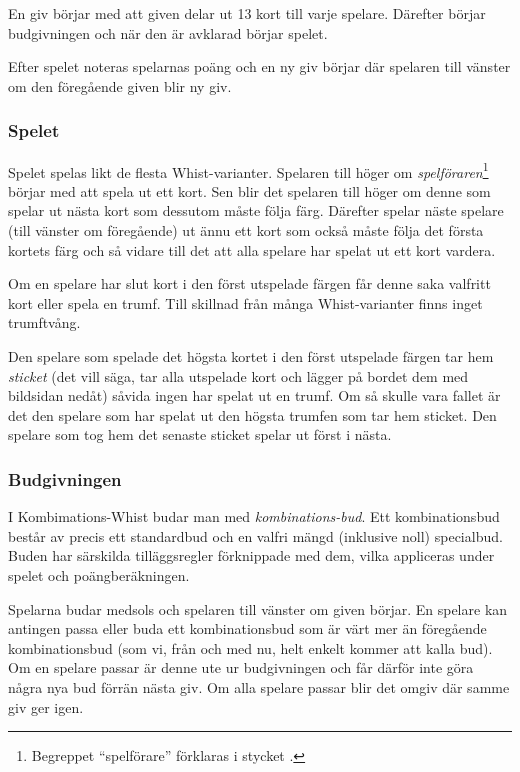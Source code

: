 \documentclass[a4paper]{article}
\begin{document}
			En giv börjar med att given delar ut 13 kort till varje spelare. Därefter börjar budgivningen och när den är avklarad börjar spelet.

			Efter spelet noteras spelarnas poäng och en ny giv börjar där spelaren till vänster om den föregående given blir ny giv.

			\subsubsection{Spelet}
				Spelet spelas likt de flesta Whist-varianter. Spelaren till höger om \emph{spelföraren}\footnote{Begreppet ``spelförare'' förklaras i stycket \textit{}.} börjar med att spela ut ett kort. Sen blir det spelaren till höger om denne som spelar ut nästa kort som dessutom måste följa färg. Därefter spelar näste spelare (till vänster om föregående) ut ännu ett kort som också måste följa det första kortets färg och så vidare till det att alla spelare har spelat ut ett kort vardera.

				Om en spelare har slut kort i den först utspelade färgen får denne saka valfritt kort eller spela en trumf. Till skillnad från många Whist-varianter finns inget trumftvång.

				Den spelare som spelade det högsta kortet i den först utspelade färgen tar hem \emph{sticket} (det vill säga, tar alla utspelade kort och lägger på bordet dem med bildsidan nedåt) såvida ingen har spelat ut en trumf. Om så skulle vara fallet är det den spelare som har spelat ut den högsta trumfen som tar hem sticket. Den spelare som tog hem det senaste sticket spelar ut först i nästa.

			\subsubsection{Budgivningen}
				\label{sec:bidding}
				I Kombimations-Whist budar man med \emph{kombinations-bud}. Ett kombinationsbud består av precis ett standardbud och en valfri mängd (inklusive noll) specialbud. Buden har särskilda tilläggsregler förknippade med dem, vilka appliceras under spelet och poängberäkningen.

				Spelarna budar medsols och spelaren till vänster om given börjar. En spelare kan antingen passa eller buda ett kombinationsbud som är värt mer än föregående kombinationsbud (som vi, från och med nu, helt enkelt kommer att kalla bud). Om en spelare passar är denne ute ur budgivningen och får därför inte göra några nya bud förrän nästa giv. Om alla spelare passar blir det omgiv där samme giv ger igen.
\end{document}
